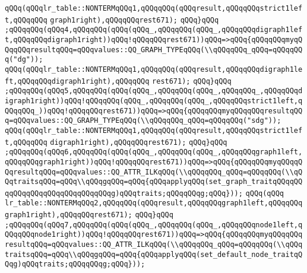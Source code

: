 \verb|qQQq(qQQqlr_table::NONTERMqQQq1,qQQqqQQq(qQQqresult,qQQqqQQqstrict1left,qQQqqQQq|\newline
\verb|graph1right),qQQqqQQqrest671);|\newline
\verb|qQQq}qQQq|\newline
\verb|;qQQqqQQq(qQQq4,qQQqqQQq(qQQq(qQQq_,qQQqqQQq(qQQq_,qQQqqQQqdigraph1left,qQQqqQQqdigraph1right))qQQq!qQQqqQQqrest671))qQQq=>qQQq{qQQqqQQqmyqQQqqQQqresultqQQq=qQQqvalues::QQ_GRAPH_TYPEqQQq(\\qQQqqQQq_qQQq=qQQqqQQq("dg"));|\newline
\verb|qQQq(qQQqlr_table::NONTERMqQQq1,qQQqqQQq(qQQqresult,qQQqqQQqdigraph1left,qQQqqQQqdigraph1right),qQQqqQQq|\newline
\verb|rest671);|\newline
\verb|qQQq}qQQq|\newline
\verb|;qQQqqQQq(qQQq5,qQQqqQQq(qQQq(qQQq_,qQQqqQQq(qQQq_,qQQqqQQq_,qQQqqQQqdigraph1right))qQQq!qQQqqQQq(qQQq_,qQQqqQQq(qQQq_,qQQqqQQqstrict1left,qQQqqQQq_))qQQq!qQQqqQQqrest671))qQQq=>qQQq{qQQqqQQqmyqQQqqQQqresultqQQq=qQQqvalues::QQ_GRAPH_TYPEqQQq(\\qQQqqQQq_qQQq=qQQqqQQq("sdg"));|\newline
\verb|qQQq(qQQqlr_table::NONTERMqQQq1,qQQqqQQq(qQQqresult,qQQqqQQqstrict1left,qQQqqQQq|\newline
\verb|digraph1right),qQQqqQQqrest671);|\newline
\verb|qQQq}qQQq|\newline
\verb|;qQQqqQQq(qQQq6,qQQqqQQq(qQQq(qQQq_,qQQqqQQq(qQQq_,qQQqqQQqgraph1left,qQQqqQQqgraph1right))qQQq!qQQqqQQqrest671))qQQq=>qQQq{qQQqqQQqmyqQQqqQQqresultqQQq=qQQqvalues::QQ_ATTR_ILKqQQq(\\qQQqqQQq_qQQq=qQQqqQQq(\\qQQqtraitsqQQq=qQQq\\qQQqgqQQq=qQQq{qQQqapplyqQQq(set_graph_traitqQQqqQQqqQQqqQQqqQQqqQQqqQQqqQQqg)qQQqtraits;qQQqqQQqg;qQQq}));|\newline
\verb|qQQq(qQQq|\newline
\verb|lr_table::NONTERMqQQq2,qQQqqQQq(qQQqresult,qQQqqQQqgraph1left,qQQqqQQqgraph1right),qQQqqQQqrest671);|\newline
\verb|qQQq}qQQq|\newline
\verb|;qQQqqQQq(qQQq7,qQQqqQQq(qQQq(qQQq_,qQQqqQQq(qQQq_,qQQqqQQqnode1left,qQQqqQQqnode1right))qQQq!qQQqqQQqrest671))qQQq=>qQQq{qQQqqQQqmyqQQqqQQqresultqQQq=qQQqvalues::QQ_ATTR_ILKqQQq(\\qQQqqQQq_qQQq=qQQqqQQq(\\qQQqtraitsqQQq=qQQq\\qQQqgqQQq=qQQq{qQQqapplyqQQq(set_default_node_traitqQQqg)qQQqtraits;qQQqqQQqg;qQQq}));|\newline
